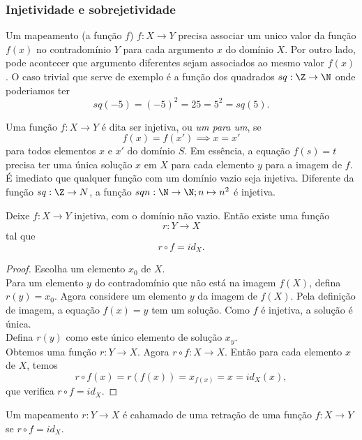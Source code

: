       \subsubsection{Injetividade e sobrejetividade}
         Um mapeamento (a função $f$) $f: X \to Y$ precisa associar um unico valor da função $f(x)$ no contradomínio $Y$ para cada argumento $x$ do domínio $X$. Por outro lado, pode acontecer que argumento diferentes sejam associados ao mesmo valor $f(x)$. O caso trivial que serve de exemplo é a função dos quadrados $sq: \Z \to \N$ onde poderiamos ter $$sq(-5) = (-5)^{2} = 25 = 5^{2} = sq(5).$$
         \begin{definition}
               Uma função $f: X \to Y$ é dita ser injetiva, ou \emph{um para um}, se $$f(x) = f(x') \implies x = x'$$
            para todos elementos $x$ e $x'$ do domínio $S$.
            Em essência, a equação $f(s) = t$ precisa ter uma única solução $x$ em $X$ para cada elemento $y$ para a imagem de $f$. É imediato que qualquer função com um domínio vazio seja injetiva. Diferente da função $sq: \Z \to N$, a função $sqn: \N \to \N; n \mapsto n^{2}$ é injetiva.
         \end{definition}
         \begin{stat}
            Deixe $f: X \to Y$ injetiva, com o domínio não vazio. Então existe uma função $$r: Y \to X$$
            tal que $$r \circ f = id_{X}.$$
            \begin{proof}
               Escolha um elemento $x_{0}$ de $X$.\\
               Para um elemento $y$ do contradomínio que não está na imagem $f(X)$, defina $r(y) = x_{0}$. Agora considere um elemento $y$ da imagem de $f(X)$. Pela definição de imagem, a equação $f(x) = y$ tem um solução. Como $f$ é injetiva, a solução é única.\\
               Defina $r(y)$ como este único elemento de solução $x_{y}$.\\
               Obtemos uma função $r: Y \to X$. Agora $r \circ f: X \to X$. Então para cada elemento $x$ de $X$, temos $$r\circ f(x) = r \left(f(x)\right) = x_{f(x)} = x = id_{X}(x),$$ que verifica $r \circ f = id_{X}.$
            \end{proof}
         \end{stat}
         \begin{definition}[Retração]
            Um mapeamento $r: Y \to X$ é cahamado de uma retração de uma função $f: X \to Y$ se $r\circ f = id_{X}.$
         \end{definition}
